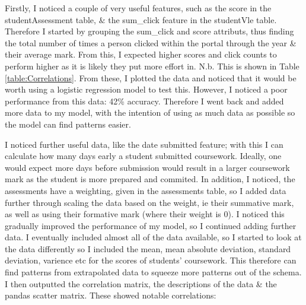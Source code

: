 \documentclass[11pt, a4paper, twocolumn]{article}
\begin{document}
Firstly, I noticed a couple of very useful features, such as the score in the studentAssessment table, $\&$ the sum\_click feature in the studentVle table.
Therefore I started by grouping the sum\_click and score attributs, thus finding the total number of times a person clicked within the portal through the year \& their average mark. 
From this, I expected higher scores and click counts to perform higher as it is likely they put more effort in. N.b. This is shown in Table \ref{table:Correlations}.
From these, I plotted the data and noticed that it would be worth using a logistic regression model to test this. However, I noticed a poor performance from this data: 42\% accuracy.
Therefore I went back and added more data to my model, with the intention of using as much data as possible so the model can find patterns easier.

I noticed further useful data, like the date submitted feature; with this I can calculate how many days early a student submitted coursework.
Ideally, one would expect more days before submission would result in a larger coursework mark as the student is more prepared and commited.
In addition, I noticed, the assessments have a weighting, given in the assessments table, so I added data further through scaling the data based on the weight, ie their summative mark,
as well as using their formative mark (where their weight is 0). I noticed this gradually improved the performance of my model, so I continued adding further data.
I eventually included almost all of the data available, so I started to look at the data differently so I included the mean, mean absolute deviation, standard deviation, varience etc for the scores of students' coursework.
This therefore can find patterns from extrapolated data to squeeze more patterns out of the schema. I then outputted the correlation matrix, the descriptions of the data \& the pandas scatter matrix.
These showed notable correlations: 
\end{document}

